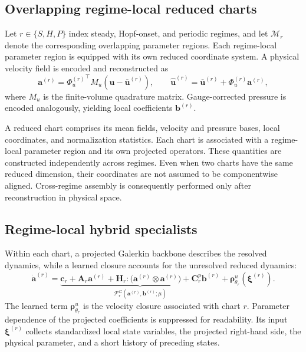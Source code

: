 \documentclass{article}
\begin{document}
\subsection{Overlapping regime-local reduced charts}

Let $r\in\{S,H,P\}$ index steady, Hopf-onset, and periodic regimes, and let $\mathcal M_r$ denote the corresponding overlapping parameter regions. Each regime-local parameter region is equipped with its own reduced coordinate system. A physical velocity field is encoded and reconstructed as
\begin{equation}
  \bm a^{(r)}={\Phi_u^{(r)}}^{\top}M_u(\bm u-\bar{\bm u}^{(r)}),\qquad
  \widehat{\bm u}^{(r)}=\bar{\bm u}^{(r)}+\Phi_u^{(r)}\bm a^{(r)},
  \label{eq:main_chart}
\end{equation}
where $M_u$ is the finite-volume quadrature matrix. Gauge-corrected pressure is encoded analogously, yielding local coefficients
$\bm b^{(r)}$. 

A reduced chart comprises its mean fields, velocity and pressure bases, local coordinates, and normalization statistics. Each chart is associated with a regime-local parameter region and its own projected operators.
These quantities are constructed independently across regimes. Even when two charts have the same reduced dimension, their coordinates are not assumed to be componentwise aligned. Cross-regime assembly is consequently performed only after reconstruction in physical space.

\subsection{Regime-local hybrid specialists}

Within each chart, a projected Galerkin backbone describes the resolved dynamics, while a learned closure accounts for the unresolved reduced dynamics:
\begin{equation}
  \dot{\bm a}^{(r)}=
  \underbrace{\bm c_r+\bm A_r\bm a^{(r)}+
  \bm H_r:\bigl(\bm a^{(r)}\otimes\bm a^{(r)}\bigr)+
  \bm C^p_r\bm b^{(r)}}_{\mathcal F_r^{G}(\bm a^{(r)},\bm b^{(r)};\mu)}
  +\bm\rho^u_{\theta_r}(\bm\xi^{(r)}).
  \label{eq:main_specialist}
\end{equation}
The learned term $\bm\rho^u_{\theta_r}$ is the velocity closure associated with chart $r$. Parameter dependence of the projected coefficients is suppressed for readability. Its input $\bm\xi^{(r)}$ collects standardized local state variables, the projected right-hand side, the physical parameter, and a short history of preceding states.
\end{document}
